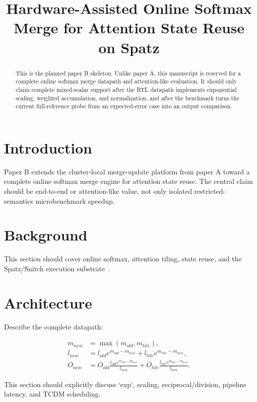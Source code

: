 \documentclass[conference]{IEEEtran}
\title{Hardware-Assisted Online Softmax Merge for Attention State Reuse on Spatz}
\author{
  \IEEEauthorblockN{Wenxuan Tang}
  \IEEEauthorblockA{Local Spatz Prototype Study}
}
\begin{document}
\maketitle

\begin{abstract}
This is the planned paper B skeleton. Unlike paper A, this manuscript is
reserved for a complete online softmax merge datapath and attention-like
evaluation. It should only claim complete mixed-scalar support after the RTL
datapath implements exponential scaling, weighted accumulation, and
normalization, and after the benchmark turns the current full-reference probe
from an expected-error case into an output comparison.
\end{abstract}

\section{Introduction}

Paper B extends the cluster-local merge-update platform from paper A toward a
complete online softmax merge engine for attention state reuse. The central
claim should be end-to-end or attention-like value, not only isolated
restricted-semantics microbenchmark speedup.

\section{Background}

This section should cover online softmax, attention tiling, state reuse, and
the Spatz/Snitch execution substrate~\cite{online-softmax2018,flashattention2022,spatz2023,snitch2020}.

\section{Architecture}

Describe the complete datapath:

\begin{align}
m_{new} &= \max(m_{old}, m_{tile}), \\
l_{new} &= l_{old}e^{m_{old}-m_{new}} +
           l_{tile}e^{m_{tile}-m_{new}}, \\
O_{new} &= O_{old}
          \frac{l_{old}e^{m_{old}-m_{new}}}{l_{new}} +
          O_{tile}
          \frac{l_{tile}e^{m_{tile}-m_{new}}}{l_{new}}.
\end{align}

This section should explicitly discuss `exp`, scaling, reciprocal/division,
pipeline latency, and TCDM scheduling.
\end{document}
